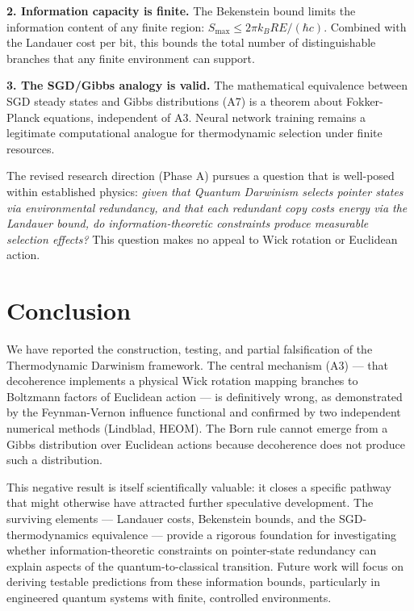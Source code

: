 \documentclass[aps,prl,twocolumn,superscriptaddress,longbibliography]{revtex4-2}
\begin{document}
\textbf{2. Information capacity is finite.} The Bekenstein bound \cite{Bekenstein1981} limits the information content of any finite region: $S_{\max} \leq 2\pi k_B R E / (\hbar c)$. Combined with the Landauer cost per bit, this bounds the total number of distinguishable branches that any finite environment can support.

\textbf{3. The SGD/Gibbs analogy is valid.} The mathematical equivalence between SGD steady states and Gibbs distributions (A7) is a theorem about Fokker-Planck equations, independent of A3. Neural network training remains a legitimate computational analogue for thermodynamic selection under finite resources.

The revised research direction (Phase A) pursues a question that is well-posed within established physics: \emph{given that Quantum Darwinism selects pointer states via environmental redundancy, and that each redundant copy costs energy via the Landauer bound, do information-theoretic constraints produce measurable selection effects?} This question makes no appeal to Wick rotation or Euclidean action.

\section{Conclusion}

We have reported the construction, testing, and partial falsification of the Thermodynamic Darwinism framework. The central mechanism (A3) --- that decoherence implements a physical Wick rotation mapping branches to Boltzmann factors of Euclidean action --- is definitively wrong, as demonstrated by the Feynman-Vernon influence functional and confirmed by two independent numerical methods (Lindblad, HEOM). The Born rule cannot emerge from a Gibbs distribution over Euclidean actions because decoherence does not produce such a distribution.

This negative result is itself scientifically valuable: it closes a specific pathway that might otherwise have attracted further speculative development. The surviving elements --- Landauer costs, Bekenstein bounds, and the SGD-thermodynamics equivalence --- provide a rigorous foundation for investigating whether information-theoretic constraints on pointer-state redundancy can explain aspects of the quantum-to-classical transition. Future work will focus on deriving testable predictions from these information bounds, particularly in engineered quantum systems with finite, controlled environments.
\end{document}
